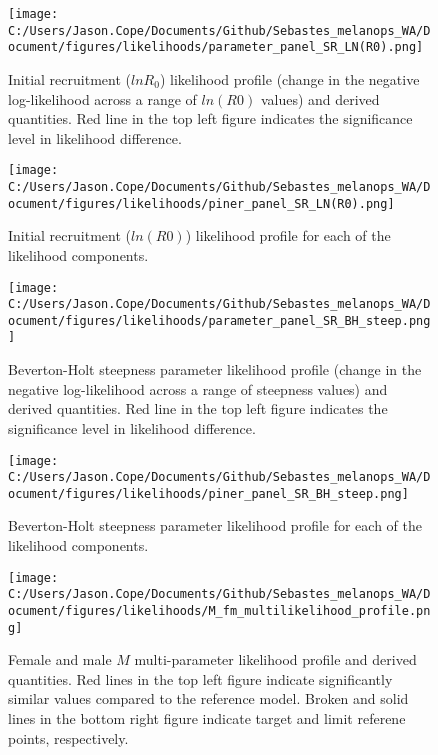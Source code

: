 \documentclass[11pt,
  letterpaper,
]{article}
\begin{document}
\begin{figure}
{\centering
\texttt{[image: C:/Users/Jason.Cope/Documents/Github/Sebastes\_melanops\_WA/Document/figures/likelihoods/parameter\_panel\_SR\_LN(R0).png]}
}
\caption{Initial recruitment ($lnR_0$) likelihood profile (change in the negative log-likelihood across a range of $ln(R0)$ values) and derived quantities. Red line in the top left figure indicates the significance level in likelihood difference.\label{fig:R0-profile}}
\end{figure}

\pagebreak

\begin{figure}
{\centering
\texttt{[image: C:/Users/Jason.Cope/Documents/Github/Sebastes\_melanops\_WA/Document/figures/likelihoods/piner\_panel\_SR\_LN(R0).png]}
}
\caption{Initial recruitment ($ln(R0)$) likelihood profile for each of the likelihood components.\label{fig:R0-profile-components}}
\end{figure}

\pagebreak

\begin{figure}
{\centering
\texttt{[image: C:/Users/Jason.Cope/Documents/Github/Sebastes\_melanops\_WA/Document/figures/likelihoods/parameter\_panel\_SR\_BH\_steep.png]}
}
\caption{Beverton-Holt steepness parameter likelihood profile (change in the negative log-likelihood across a range of steepness values) and derived quantities. Red line in the top left figure indicates the significance level in likelihood difference.\label{fig:steepness-profile}}
\end{figure}

\pagebreak

\begin{figure}
{\centering
\texttt{[image: C:/Users/Jason.Cope/Documents/Github/Sebastes\_melanops\_WA/Document/figures/likelihoods/piner\_panel\_SR\_BH\_steep.png]}
}
\caption{Beverton-Holt steepness parameter likelihood profile for each of the likelihood components.\label{fig:steepness-profile-components}}
\end{figure}

\pagebreak

\begin{figure}
{\centering
\texttt{[image: C:/Users/Jason.Cope/Documents/Github/Sebastes\_melanops\_WA/Document/figures/likelihoods/M\_fm\_multilikelihood\_profile.png]}
}
\caption{Female and male $M$ multi-parameter likelihood profile and derived quantities. Red lines in the top left figure indicate significantly similar values compared to the reference model. Broken and solid lines in the bottom right figure indicate target and limit referene points, respectively.\label{fig:M-multiprofile-combo}}
\end{figure}
\end{document}
